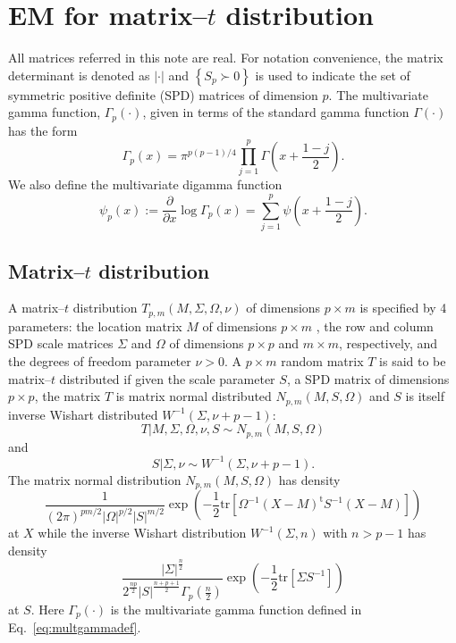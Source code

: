 \documentclass[english,listof=totoc]{scrartcl}
\begin{document}
\section{EM for matrix--$t$ distribution}\label{sec:derivation}

All matrices referred in this note are real. For notation convenience, the matrix determinant is denoted as $|\cdot|$ and $\left\{S_p\succ 0\right\}$ is used to indicate the set of symmetric positive definite (SPD) matrices of dimension $p$. The multivariate gamma
function, $\Gamma_{p}(\cdot)$, given in terms of the standard gamma function $\Gamma(\cdot)$ has the form
\begin{equation}
\Gamma_{p}(x)=\pi^{p(p-1)/4}\prod_{j=1}^{p}\Gamma\left(x+\frac{1-j}{2}\right).\label{eq:multgammadef}
\end{equation}
We also define the multivariate digamma function
%
\begin{equation}
\psi_{p}(x):=\frac{\partial}{\partial x}\log\Gamma_{p}(x)=\sum_{j=1}^{p}\psi\left(x+\frac{1-j}{2}\right).
\end{equation}

\subsection{Matrix--$t$ distribution}

A matrix--$t$ distribution $T_{p,m}(M,\Sigma,\Omega,\nu)$ of dimensions $p\times m$ is specified by 4 parameters: the location matrix $M$ of dimensions $p\times m$ , the row and column SPD scale matrices $\Sigma$ and $\Omega$ of dimensions $p\times p$ and $m\times m$, respectively, and the degrees of freedom parameter $\nu>0$. A $p \times m$ random matrix $T$ is said to be matrix--$t$ distributed if given the scale parameter $S$, a SPD matrix of dimensions $p\times p$, the matrix $T$ is matrix normal distributed $N_{p,m}(M,S,\Omega)$ and $S$ is itself inverse Wishart distributed $W^{-1}(\Sigma,\nu +p -1)$:
\begin{equation}
T|M,\Sigma,\Omega,\nu,S \sim N_{p,m}(M,S,\Omega)\label{eq:tdef1}
\end{equation}
and
\begin{equation}
S|\Sigma,\nu \sim W^{-1}(\Sigma,\nu+p-1).\label{eq:tdef2}
\end{equation}
The matrix normal distribution $N_{p,m}(M,S,\Omega)$ has density
\begin{equation}
\frac{1}{(2\pi)^{pm/2}|\Omega|^{p/2}|S|^{m/2}}\exp\left(-\frac{1}{2}\textrm{tr}\left[\Omega^{-1}(X-M)^{\textrm{t}}S^{-1}(X-M)\right]\right)\label{eq:ndistpdf}
\end{equation}
at $X$ while the inverse Wishart distribution $W^{-1}(\Sigma,n)$ with $n>p-1$ has density
\begin{equation}
\frac{|\Sigma|^{\frac{n}{2}}}{2^{\frac{n p}{2}}|S|^{\frac{n+p+1}{2}}\Gamma_{p}(\frac{n}{2})}\exp\left(-\frac{1}{2}\textrm{tr}\left[\Sigma S^{-1}\right]\right)\label{eq:wdistpdf}
\end{equation}
at $S$. Here $\Gamma_{p}(\cdot)$ is the
multivariate gamma function defined in Eq.~\eqref{eq:multgammadef}.
\end{document}
